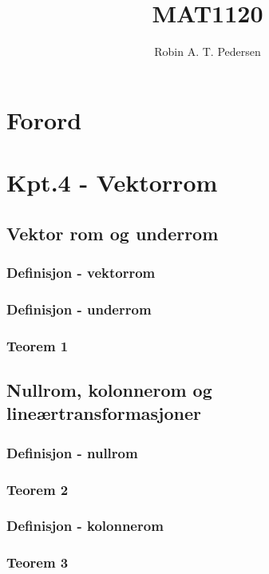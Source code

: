 \documentclass{article}
\begin{document}
  \title{MAT1120}
  \author{Robin A. T. Pedersen}
  \maketitle
  \tableofcontents

  \section{Forord}
    
  \setcounter{section}{3} %
  \section{Kpt.4 - Vektorrom}
    \subsection{Vektor rom og underrom}
      \subsubsection{Definisjon - vektorrom}
        
      \subsubsection{Definisjon - underrom}
        
      \subsubsection{Teorem 1}
        
    \subsection{Nullrom, kolonnerom og lineærtransformasjoner}
      \subsubsection{Definisjon - nullrom}
        
      \subsubsection{Teorem 2}
        
      \subsubsection{Definisjon - kolonnerom}
        
      \subsubsection{Teorem 3}
        
\end{document}
